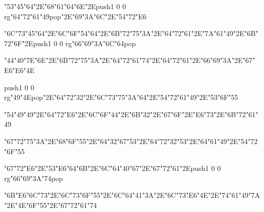 \vfill\eject
\null\vfill
\centerline{\ipa\char"53\ipa\char"45\ipa\char"64\ipa\char"2E\ipa\char"68\ipa\char"61\ipa\char"64\ipa\char"6E\ipa\char"2E\pdfcolorstack\match push{1 0 0 rg}\ipa\char"64\ipa\char"72\ipa\char"61\ipa\char"49\pdfcolorstack\match pop{}\ipa\char"2E\ipa\char"69\ipa\char"3A\ipa\char"6C\ipa\char"2E\ipa\char"54\ipa\char"72\ipa\char"E6}\bigskip
\centerline{\ipa\char"6C\ipa\char"73\ipa\char"45\ipa\char"64\ipa\char"2E\ipa\char"6C\ipa\char"6F\ipa\char"54\ipa\char"64\ipa\char"2E\ipa\char"6B\ipa\char"72\ipa\char"75\ipa\char"3A\ipa\char"2E\ipa\char"64\ipa\char"72\ipa\char"61\ipa\char"2E\ipa\char"7A\ipa\char"61\ipa\char"49\ipa\char"2E\ipa\char"6B\ipa\char"72\ipa\char"6F\ipa\char"2E\pdfcolorstack\match push{1 0 0 rg}\ipa\char"66\ipa\char"69\ipa\char"3A\ipa\char"6C\ipa\char"64\pdfcolorstack\match pop{}}\bigskip
\centerline{\ipa\char"44\ipa\char"40\ipa\char"7E\ipa\char"6E\ipa\char"2E\ipa\char"6B\ipa\char"72\ipa\char"75\ipa\char"3A\ipa\char"2E\ipa\char"64\ipa\char"72\ipa\char"61\ipa\char"74\ipa\char"2E\ipa\char"64\ipa\char"72\ipa\char"61\ipa\char"2E\ipa\char"66\ipa\char"69\ipa\char"3A\ipa\char"2E\ipa\char"67\ipa\char"E6\ipa\char"E6\ipa\char"4E}
\vfill\eject
\null\vfill
\centerline{\pdfcolorstack\match push{1 0 0 rg}\ipa\char"49\ipa\char"4E\pdfcolorstack\match pop{}\ipa\char"2E\ipa\char"64\ipa\char"72\ipa\char"32\ipa\char"2E\ipa\char"6C\ipa\char"73\ipa\char"75\ipa\char"3A\ipa\char"64\ipa\char"2E\ipa\char"54\ipa\char"72\ipa\char"61\ipa\char"49\ipa\char"2E\ipa\char"53\ipa\char"6F\ipa\char"55}\bigskip
\centerline{\ipa\char"54\ipa\char"49\ipa\char"49\ipa\char"2E\ipa\char"64\ipa\char"72\ipa\char"E6\ipa\char"2E\ipa\char"6C\ipa\char"6F\ipa\char"44\ipa\char"2E\ipa\char"6B\ipa\char"32\ipa\char"2E\ipa\char"67\ipa\char"6F\ipa\char"2E\ipa\char"E6\ipa\char"73\ipa\char"2E\ipa\char"6B\ipa\char"72\ipa\char"61\ipa\char"49}\bigskip
\centerline{\ipa\char"67\ipa\char"72\ipa\char"75\ipa\char"3A\ipa\char"2E\ipa\char"68\ipa\char"6F\ipa\char"55\ipa\char"2E\ipa\char"64\ipa\char"32\ipa\char"67\ipa\char"53\ipa\char"2E\ipa\char"64\ipa\char"72\ipa\char"32\ipa\char"53\ipa\char"2E\ipa\char"64\ipa\char"61\ipa\char"49\ipa\char"2E\ipa\char"54\ipa\char"72\ipa\char"6F\ipa\char"55}
\vfill\eject
\null\vfill
\centerline{\ipa\char"67\ipa\char"72\ipa\char"E6\ipa\char"2E\ipa\char"53\ipa\char"E6\ipa\char"64\ipa\char"6B\ipa\char"2E\ipa\char"6C\ipa\char"64\ipa\char"40\ipa\char"67\ipa\char"2E\ipa\char"67\ipa\char"72\ipa\char"61\ipa\char"2E\pdfcolorstack\match push{1 0 0 rg}\ipa\char"66\ipa\char"69\ipa\char"3A\ipa\char"74\pdfcolorstack\match pop{}}\bigskip
\centerline{\ipa\char"6B\ipa\char"E6\ipa\char"6C\ipa\char"73\ipa\char"2E\ipa\char"6C\ipa\char"73\ipa\char"6F\ipa\char"55\ipa\char"2E\ipa\char"6C\ipa\char"64\ipa\char"41\ipa\char"3A\ipa\char"2E\ipa\char"6C\ipa\char"73\ipa\char"E6\ipa\char"4E\ipa\char"2E\ipa\char"74\ipa\char"61\ipa\char"49\ipa\char"7A\ipa\char"2E\ipa\char"4E\ipa\char"6F\ipa\char"55\ipa\char"2E\ipa\char"67\ipa\char"72\ipa\char"61\ipa\char"74}\bigskip

